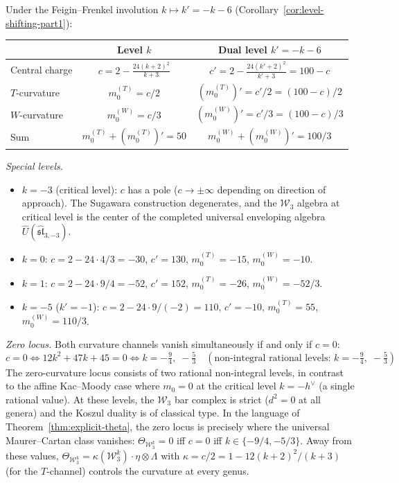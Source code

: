 \begin{computation}
\label{comp:w3-curvature-dual}

Under the Feigin--Frenkel involution $k \mapsto k' = -k-6$
(Corollary~\ref{cor:level-shifting-part1}):
\begin{center}
\renewcommand{\arraystretch}{1.3}
\begin{tabular}{l|cc}
& Level $k$ & Dual level $k' = -k-6$ \\
\hline
Central charge & $c = 2 - \frac{24(k+2)^2}{k+3}$ &
$c' = 2 - \frac{24(k'+2)^2}{k'+3} = 100 - c$ \\[6pt]
$T$-curvature & $m_0^{(T)} = c/2$ &
$(m_0^{(T)})' = c'/2 = (100-c)/2$ \\[4pt]
$W$-curvature & $m_0^{(W)} = c/3$ &
$(m_0^{(W)})' = c'/3 = (100-c)/3$ \\[4pt]
Sum & $m_0^{(T)} + (m_0^{(T)})' = 50$ &
$m_0^{(W)} + (m_0^{(W)})' = 100/3$
\end{tabular}
\end{center}

\emph{Special levels.}
\begin{itemize}
\item $k = -3$ (critical level): $c$ has a pole ($c \to \pm\infty$
depending on direction of approach).  The Sugawara construction
degenerates, and the $\mathcal{W}_3$ algebra at critical level is
the center of the completed universal enveloping algebra
$\widehat{U}(\widehat{\mathfrak{sl}}_{3,-3})$.
\item $k = 0$: $c = 2 - 24 \cdot 4/3 = -30$,
$c' = 130$, $m_0^{(T)} = -15$, $m_0^{(W)} = -10$.
\item $k = 1$: $c = 2 - 24 \cdot 9/4 = -52$,
$c' = 152$, $m_0^{(T)} = -26$, $m_0^{(W)} = -52/3$.
\item $k = -5$ ($k' = -1$): $c = 2 - 24 \cdot 9/(-2) = 110$,
$c' = -10$, $m_0^{(T)} = 55$, $m_0^{(W)} = 110/3$.
\end{itemize}

\emph{Zero locus.}
Both curvature channels vanish simultaneously if and only if $c = 0$:
\[
c = 0 \iff 12k^2 + 47k + 45 = 0 \iff k = -\tfrac{9}{4},\; -\tfrac{5}{3}
\quad (\text{non-integral rational levels: } k = -\tfrac{9}{4},\; -\tfrac{5}{3})
\]
The zero-curvature locus consists of two rational non-integral levels, in contrast
to the affine Kac--Moody case where $m_0 = 0$ at the critical level
$k = -h^\vee$ (a single rational value).  At these levels, the
$\mathcal{W}_3$ bar complex is strict ($d^2 = 0$ at all genera)
and the Koszul duality is of classical type.
In the language of Theorem~\ref{thm:explicit-theta}, the zero locus
is precisely where the universal Maurer--Cartan class vanishes:
$\Theta_{\mathcal{W}_3^k} = 0$ iff $c = 0$ iff
$k \in \{-9/4, -5/3\}$.  Away from these values,
$\Theta_{\mathcal{W}_3^k} = \kappa(\mathcal{W}_3^k)
\cdot \eta \otimes \Lambda$ with
$\kappa = c/2 = 1 - 12(k+2)^2/(k+3)$
(for the $T$-channel) controls the curvature at every genus.
\end{computation}

